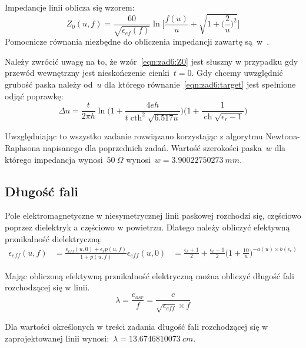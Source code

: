 \documentclass[rep.tex]{subfiles}
\begin{document}
Impedancje linii oblicza się wzorem:
\begin{equation}
  Z_0(u, f) = \frac{60}{\sqrt{\epsilon_{ef}(f)}} \ln\Bigg[\frac{f(u)}{u} + \sqrt{1 + \bigg(\frac{2}{u}\bigg)^2}\Bigg] \label{eqn:zad6:Z0}
\end{equation}
Pomocnicze równania niezbędne do obliczenia impedancji zawartę są~w~\cite{obwody}.

Należy zwrócić uwagę na to, że wzór~\ref{eqn:zad6:Z0} jest słuszny w przypadku gdy przewód wewnętrzny jest nieskończenie cienki~$t = 0$.
Gdy chcemy uwzględnić grubość paska należy od~$u$ dla którego równanie~\ref{eqn:zad6:target} jest spełnione odjąć poprawkę:
\begin{equation}
  \Delta u = \frac{t}{2 \pi h}\ln\Big( 1 + \frac{4eh}{t\operatorname{cth}^2\sqrt{6.517u}}\Big)\Big(1 + \frac{1}{\operatorname{ch}\sqrt{\epsilon_r - 1}}\Big) \label{eqn:zad6:du}
\end{equation}

Uwzględniając to wszystko zadanie rozwiązano korzystając z algorytmu Newtona-Raphsona napisanego dla poprzednich zadań.
Wartość szerokości paska~$w$ dla którego impedancja wynosi~$50~\Omega$ wynosi~$w = 3.90022750273~mm$.

\subsection{Długość fali}
Pole elektromagnetyczne w niesymetrycznej linii paskowej rozchodzi się, częściowo poprzez dielektryk a częściowo w powietrzu.
Dlatego należy obliczyć efektywną prznikalność dielektryczną:
\begin{align}
  \epsilon_{eff}(u, f) &= \frac{\epsilon_{eff}(u, 0) + \epsilon_rp(u, f)}{1 + p(u, f)}
  \epsilon_{eff}(u, 0) &= \frac{\epsilon_r + 1}{2} + \frac{\epsilon_r - 1}{2}\Big(1 + \frac{10}{u}\Big)^{-a(u)\times b(\epsilon_r)}
\end{align}

Mając obliczoną efektywną prznikalność elektryczną można obliczyć długość fali rozchodzącej się w linii.
\begin{equation}
  \lambda = \frac{c_{osr}}{f} = \frac{c}{\sqrt{\epsilon_{eff}}\times f} \label{eqn:zad6:lambda}
\end{equation}

Dla wartości określonych w treści zadania długość fali rozchodzącej się w zaprojektowanej linii wynosi:~$\lambda = 13.6746810073~cm$.
\end{document}
